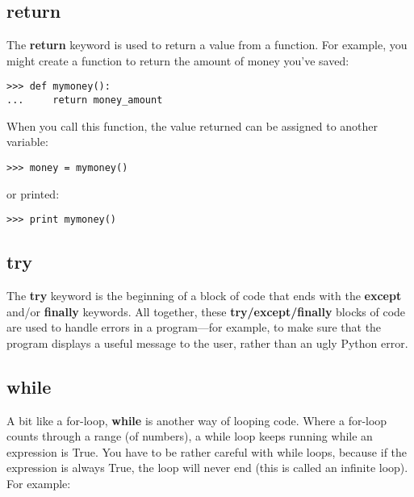 \subsection*{return}

The \textbf{return} keyword is used to return a value from a function.  For example, you might create a function to return the amount of money you've saved:

\begin{listingignore}
\begin{verbatim}
>>> def mymoney():
...     return money_amount
\end{verbatim}
\end{listingignore}

\noindent
When you call this function, the value returned can be assigned to another variable:

\begin{listingignore}
\begin{verbatim}
>>> money = mymoney()
\end{verbatim}
\end{listingignore}

\noindent
or printed:

\begin{listingignore}
\begin{verbatim}
>>> print mymoney()
\end{verbatim}
\end{listingignore}

\subsection*{try}

The \textbf{try} keyword is the beginning of a block of code that ends with the \textbf{except} and/or \textbf{finally} keywords.  All together, these \textbf{try/except/finally} blocks of code are used to handle errors in a program---for example, to make sure that the program displays a useful message to the user, rather than an ugly Python error.

\subsection*{while}

A bit like a for-loop, \textbf{while} is another way of looping code.  Where a for-loop counts through a range (of numbers), a while loop keeps running while an expression is True.  You have to be rather careful with while loops, because if the expression is always True, the loop will never end (this is called an infinite loop).  For example:

